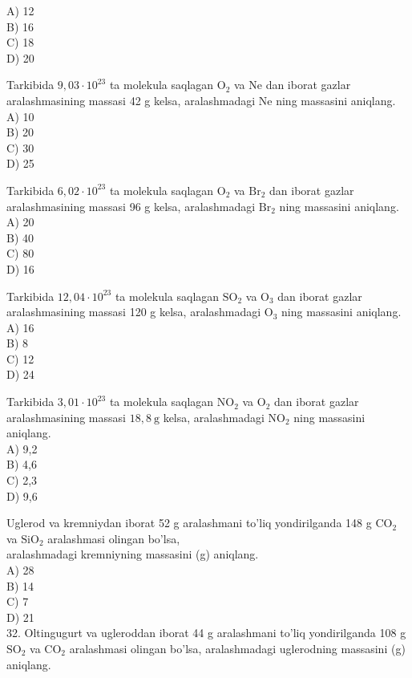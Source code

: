 A) 12\\
B) 16\\
C) 18\\
D) 20
  \item Tarkibida $9,03 \cdot 10^{23}$ ta molekula saqlagan $\mathrm{O}_{2}$ va Ne dan iborat gazlar aralashmasining massasi 42 g kelsa, aralashmadagi Ne ning massasini aniqlang.\\
A) 10\\
B) 20\\
C) 30\\
D) 25
  \item Tarkibida $6,02 \cdot 10^{23}$ ta molekula saqlagan $\mathrm{O}_{2}$ va $\mathrm{Br}_{2}$ dan iborat gazlar aralashmasining massasi 96 g kelsa, aralashmadagi $\mathrm{Br}_{2}$ ning massasini aniqlang.\\
A) 20\\
B) 40\\
C) 80\\
D) 16
  \item Tarkibida $12,04 \cdot 10^{23}$ ta molekula saqlagan $\mathrm{SO}_{2}$ va $\mathrm{O}_{3}$ dan iborat gazlar aralashmasining massasi 120 g kelsa, aralashmadagi $\mathrm{O}_{3}$ ning massasini aniqlang.\\
A) 16\\
B) 8\\
C) 12\\
D) 24
  \item Tarkibida $3,01 \cdot 10^{23}$ ta molekula saqlagan $\mathrm{NO}_{2}$ va $\mathrm{O}_{2}$ dan iborat gazlar aralashmasining massasi $18,8 \mathrm{~g}$ kelsa, aralashmadagi $\mathrm{NO}_{2}$ ning massasini aniqlang.\\
A) 9,2\\
B) 4,6\\
C) 2,3\\
D) 9,6
  \item Uglerod va kremniydan iborat 52 g aralashmani to'liq yondirilganda 148 g $\mathrm{CO}_{2}$ va $\mathrm{SiO}_{2}$ aralashmasi olingan bo'lsa,\\
aralashmadagi kremniyning massasini (g) aniqlang.\\
A) 28\\
B) 14\\
C) 7\\
D) 21\\
32. Oltingugurt va ugleroddan iborat 44 g aralashmani to'liq yondirilganda 108 g $\mathrm{SO}_{2}$ va $\mathrm{CO}_{2}$ aralashmasi olingan bo'lsa, aralashmadagi uglerodning massasini (g) aniqlang.\\
